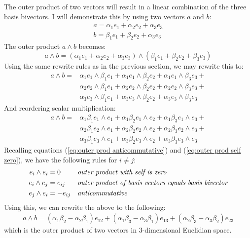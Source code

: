 \documentclass[10pt]{report}
\begin{document}
The outer product of two vectors will result in a linear
combination of the three basis bivectors. I will demonstrate this
by using two vectors $a$ and $b$:
\begin{align}
    a = \alpha_{1}e_{1} + \alpha_{2}e_{2} + \alpha_{3}e_{3} \nonumber \\
    b = \beta_{1}e_{1}  + \beta_{2}e_{2} + \alpha_{3}e_{3}  \nonumber
\end{align}
The outer product $a\wedge b$ becomes:
\begin{displaymath}
    a\wedge b = (\alpha_{1}e_{1} + \alpha_{2}e_{2} + \alpha_{3}e_{3})\wedge(\beta_{1}e_{1}  + \beta_{2}e_{2} + \beta_{3}e_{3})
\end{displaymath}
Using the same rewrite rules as in the previous section, we may
rewrite this to:
\begin{align}
    a\wedge b = &\alpha_{1}e_{1}\wedge \beta_{1}e_{1} + \alpha_{1}e_{1}\wedge \beta_{2}e_{2} + \alpha_{1}e_{1}\wedge \beta_{3}e_{3} + \nonumber \\
                &\alpha_{2}e_{2}\wedge \beta_{1}e_{1} + \alpha_{2}e_{2}\wedge \beta_{2}e_{2} + \alpha_{2}e_{2}\wedge \beta_{3}e_{3} + \nonumber \\
                &\alpha_{3}e_{3}\wedge \beta_{1}e_{1} + \alpha_{3}e_{3}\wedge \beta_{2}e_{2} + \alpha_{3}e_{3}\wedge \beta_{3}e_{3}   \nonumber
\end{align}
And reordering scalar multiplication:
\begin{align}
    a\wedge b = &\alpha_{1}\beta_{1}e_{1}\wedge e_{1} + \alpha_{1}\beta_{2}e_{1}\wedge e_{2} + \alpha_{1}\beta_{3}e_{1}\wedge e_{3} + \nonumber \\
                &\alpha_{2}\beta_{1}e_{2}\wedge e_{1} + \alpha_{2}\beta_{2}e_{2}\wedge e_{2} + \alpha_{2}\beta_{3}e_{2}\wedge e_{3} + \nonumber \\
                &\alpha_{3}\beta_{1}e_{3}\wedge e_{1} + \alpha_{3}\beta_{2}e_{3}\wedge e_{2} + \alpha_{3}\beta_{3}e_{3}\wedge e_{3}   \nonumber
\end{align}
Recalling equations (\ref{eq:outer prod anticommutative}) and
(\ref{eq:outer prod self zero}), we have the following rules for
$i \neq j$:
\begin{align}
    e_{i}\wedge e_{i} &= 0         \nonumber && \text{\emph{outer product with self is zero}}\\
    e_{i}\wedge e_{j} &= e_{ij}    \nonumber && \text{\emph{outer product of basis vectors equals basis bivector}}\\
    e_{j}\wedge e_{i} &= -e_{ij}   \nonumber && \text{\emph{anticommutative}}
\end{align}
Using this, we can rewrite the above to the following:
\begin{align}
    \label{eq:wedge in 3d}
    a\wedge b = (\alpha_{1}\beta_{2} - \alpha_{2}\beta_{1})e_{12} +
                (\alpha_{1}\beta_{3} - \alpha_{3}\beta_{1})e_{13} +
                (\alpha_{2}\beta_{3} - \alpha_{3}\beta_{2})e_{23}
\end{align}
which is the outer product of two vectors in $3$-dimensional
Euclidian space.
\end{document}
